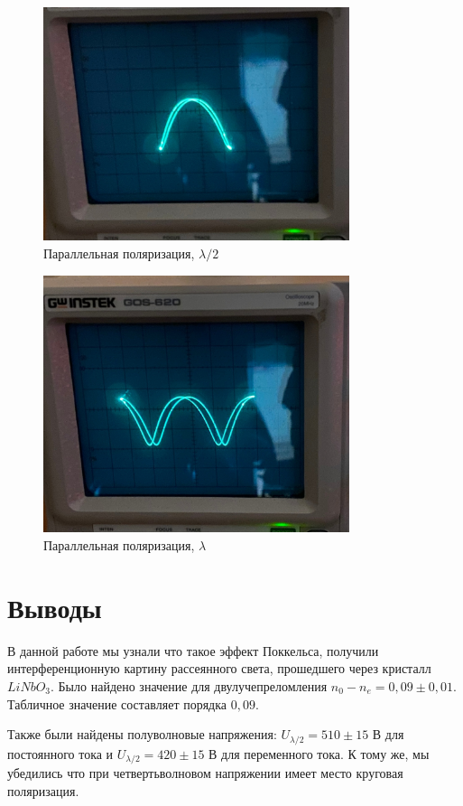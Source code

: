 \documentclass[a4paper, 12pt]{article}
\begin{document}
\begin{figure}[H]
    \centering
    \includegraphics[width=0.8\textwidth]{i1}
    \caption{Параллельная поляризация, $\lambda/2$}
    \label{fig:i1}
\end{figure}

\begin{figure}[H]
    \centering
    \includegraphics[width=0.8\textwidth]{i2}
    \caption{Параллельная поляризация, $\lambda$}
    \label{fig:i2}
\end{figure}

\section{Выводы}
В данной работе мы узнали что такое эффект Поккельса, получили интерференционную картину рассеянного света, прошедшего через кристалл $LiNbO_3$.
Было найдено значение для двулучепреломления $n_0 - n_e = 0,09 \pm 0,01$. Табличное значение составляет порядка $0,09$. 

Также были найдены полуволновые напряжения: $U_{\lambda/2} = 510 \pm 15$ В для постоянного тока и $U_{\lambda/2} = 420 \pm 15$ В для переменного тока. К тому же, мы убедились что при четвертьволновом напряжении имеет место круговая поляризация.
\end{document}
